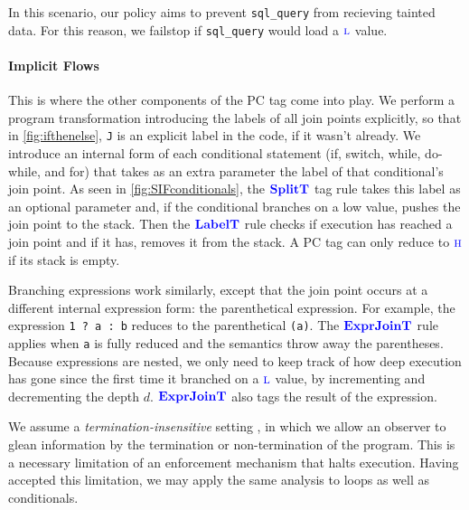 \documentclass{llncs}
\begin{document}
\begin{table}[t]
In this scenario, our policy aims to prevent {\tt sql\_query} from recieving tainted data.
For this reason, we failstop if {\tt sql\_query} would load a \(\textnormal{\color{blue} \sc l}\) value.

\paragraph*{Implicit Flows}

This is where the other components of the PC tag come into play. We perform a program
transformation introducing the labels of all join points explicitly, so that in
\cref{fig:ifthenelse}, {\tt J} is an explicit label in the code, if it wasn't already.
We introduce an internal form of each conditional statement
(if, switch, while, do-while, and for) that takes as an extra parameter the label of
that conditional's join point. As seen in \cref{fig:SIFconditionals}, the
\(\color{blue} \mathbf{SplitT}\) tag rule takes this label as an optional parameter and, if
the conditional branches on a low value, pushes the join point to the stack.
Then the \(\color{blue} \mathbf{LabelT}\) rule checks if execution has reached a join point and
if it has, removes it from the stack. A PC tag can only reduce to \(\textnormal{\color{blue} \sc h}\)
if its stack is empty.

Branching expressions work similarly, except that the join point occurs at a different
internal expression form: the parenthetical expression. For example, the expression
{\tt 1 ? a : b} reduces to the parenthetical {\tt (a)}. The \(\color{blue} \mathbf{ExprJoinT}\) rule
applies when {\tt a} is fully reduced and the semantics throw away the parentheses.
Because expressions are nested, we only need to keep track of how deep execution has
gone since the first time it branched on a \(\textnormal{\color{blue} \sc l}\) value, by incrementing and decrementing
the depth \(d\).  \(\color{blue} \mathbf{ExprJoinT}\) also tags the result of the expression.

We assume a {\em termination-insensitive} setting \cite{Askarov08:TINILeaks}, in which
we allow an observer to glean information by the termination or non-termination of
the program. This is a necessary limitation of an enforcement mechanism that halts
execution. Having accepted this limitation, we may apply the same analysis to loops
as well as conditionals.


\end{table}
\end{document}

